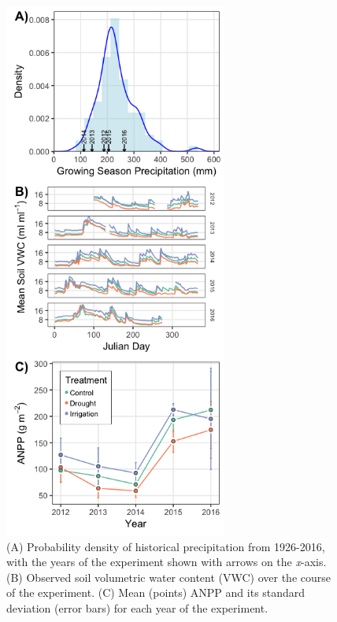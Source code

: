 \documentclass[fleqn,10pt,lineno]{wlpeerj} %
\begin{document}
\newpage{}

\begin{figure}[!ht]
  \centering
      \includegraphics[height=7in]{../figures/data_panels.png}
  \caption{(A) Probability density of historical precipitation from 1926-2016, with the years of the experiment shown with arrows on the \emph{x}-axis. (B) Observed soil volumetric water content (VWC) over the course of the experiment. (C) Mean (points) ANPP and its standard deviation (error bars) for each year of the experiment.}
\end{figure}

\newpage{}
\end{document}
